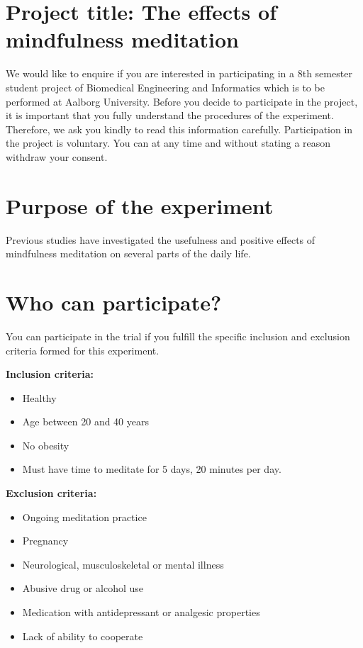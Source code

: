 \section*{Project title: The effects of mindfulness meditation} 
We would like to enquire if you are interested in participating in a 8th semester student project of Biomedical Engineering and Informatics which is to be performed at Aalborg University.
Before you decide to participate in the project, it is important that you fully understand the procedures of the experiment. Therefore, we ask you kindly to read this information carefully.
Participation in the project is voluntary. You can at any time and without stating a reason withdraw your consent.

\section*{Purpose of the experiment}
Previous studies have investigated the usefulness and positive effects of mindfulness meditation on several parts of the daily life.

\section*{Who can participate?}
You can participate in the trial if you fulfill the specific inclusion and exclusion criteria formed for this experiment. 

\textbf{Inclusion criteria:}
	\vspace{-.5cm}
\begin{itemize}
	\item Healthy
	\vspace{-.3cm}
	\item Age between 20 and 40 years
	\vspace{-.3cm}
	\item No obesity 
	\vspace{-.3cm}
	\item Must have time to meditate for 5 days, 20 minutes per day.
\end{itemize}

\textbf{Exclusion criteria:}
	\vspace{-.5cm}
\begin{itemize}
	\item Ongoing meditation practice 
	\vspace{-.3cm}
	\item Pregnancy 
	\vspace{-.3cm}
	\item Neurological, musculoskeletal or mental illness
	\vspace{-.3cm}
	\item Abusive drug or alcohol use
	\vspace{-.3cm}
	\item Medication with antidepressant or analgesic properties
\vspace{-.3cm}
	\item Lack of ability to cooperate
\end{itemize}

